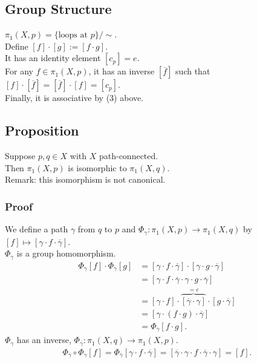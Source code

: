 \documentclass[11pt]{article}
\begin{document}
\subsection*{Group Structure}
\label{sec:org5a26106}
\(\pi_{1}(X,p)=\{\text{loops at }p\}/\sim\).\\
Define \([f]\cdot[g]:=[f\cdot g]\).\\
It has an identity element \([c_{p}]=e\).\\
For any \(f\in\pi_{1}(X,p)\), it has an inverse \([\overline{f}]\) such that \([f]\cdot[\overline{f}]=[\overline{f}]\cdot[f]=[c_{p}]\).\\
Finally, it is associative by (3) above.\\
\subsection*{Proposition}
\label{sec:orgbf04093}
Suppose \(p,q\in X\) with \(X\) path-connected.\\
Then \(\pi_{1}(X,p)\) is isomorphic to \(\pi_{1}(X,q)\).\\
Remark: this isomorphism is not canonical.\\
\subsubsection*{Proof}
\label{sec:org1b0caa1}
We define a path \(\gamma\) from \(q\) to \(p\) and \(\Phi_{\gamma}:\pi_{1}(X,p)\to\pi_{1}(X,q)\) by \([f]\mapsto[\gamma\cdot f\cdot \overline{\gamma}]\).\\
\(\Phi_{\gamma}\) is a group homomorphism.\\
\begin{align*}
  \Phi_{\gamma}[f]\cdot\Phi_{\gamma}[g]
  &=[\gamma\cdot f\cdot\overline{\gamma}]\cdot[\gamma\cdot g\cdot \overline{\gamma}] \\
  &=[\gamma\cdot f\cdot \overline{\gamma}\cdot\gamma \cdot g\cdot \overline{\gamma}] \\
  &=[\gamma\cdot f]\cdot\overbrace{[\overline{\gamma}\cdot\gamma]}^{=e}\cdot[g\cdot \overline{\gamma}] \\
  &=[\gamma\cdot(f\cdot g)\cdot\overline{\gamma}] \\
  &=\Phi_{\gamma}[f\cdot g].
\end{align*}
\(\Phi_{\gamma}\) has an inverse, \(\Phi_{\overline{\gamma}}:\pi_{1}(X,q)\to\pi_{1}(X,p)\).\\
\begin{align*}
  \Phi_{\overline{\gamma}}\circ\Phi_{\gamma}[f]
  =\Phi_{\overline{\gamma}}[\gamma\cdot f\cdot\overline{\gamma}]
  =[\overline{\gamma}\cdot\gamma\cdot f\cdot \overline{\gamma}\cdot\gamma]
  =[f].
\end{align*}
\end{document}
